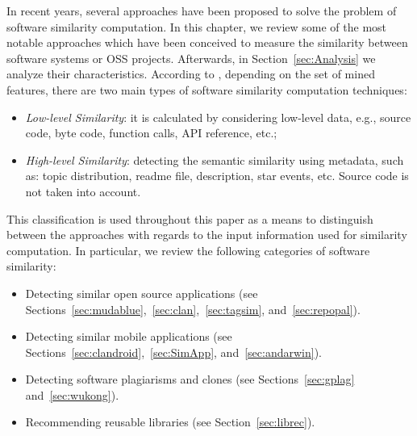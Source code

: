 In recent years, several approaches have been proposed to solve the problem of software similarity computation. In this chapter, we review some of the most notable approaches which have been conceived to measure the similarity between software systems or OSS projects. Afterwards, in Section~\ref{sec:Analysis} we analyze their characteristics. According to \cite{Chen:2015:SFD:2684822.2685305}, depending on the set of mined features, there are two main types of software similarity computation techniques: 

\begin{itemize}	
	\item \textit{Low-level Similarity}: it is calculated by considering low-level data, e.g., source code, byte code, function calls, API reference, etc.; 
	\item \textit{High-level Similarity}: detecting the semantic similarity using metadata, such as: topic distribution, readme file, description, star events, etc. Source code is not taken into account.	
\end{itemize}

This classification is used throughout this paper as a means to distinguish between the approaches with regards to the input information used for similarity computation. In particular, we review the following categories of software similarity:

\begin{itemize}
	\item Detecting similar open source applications (see Sections~\ref{sec:mudablue},~\ref{sec:clan},~\ref{sec:tagsim}, and~\ref{sec:repopal}).
	\item Detecting similar mobile applications (see Sections~\ref{sec:clandroid},~\ref{sec:SimApp}, and~\ref{sec:andarwin}).
	\item Detecting software plagiarisms and clones (see Sections~\ref{sec:gplag} and~\ref{sec:wukong}).
	\item Recommending reusable libraries (see Section~\ref{sec:librec}).
\end{itemize}





